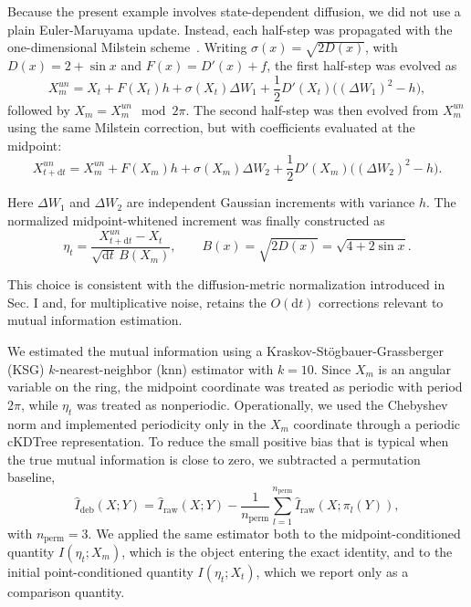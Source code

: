 Because the present example involves state-dependent diffusion, we did not use a plain Euler-Maruyama update. Instead, each half-step was propagated with the one-dimensional Milstein scheme~\cite{milstein1975strong,kloeden1992numerical}. Writing $\sigma(x)=\sqrt{2D(x)}$, with $D(x)=2+\sin x$ and $F(x)=D'(x)+f$, the first half-step was evolved as
\[
    X_m^{un}=X_t+F(X_t)h+\sigma(X_t)\Delta W_1
    +\frac{1}{2}D'(X_t)\big((\Delta W_1)^2-h\big),
\]
followed by $X_m=X_m^{un}\mod{2\pi}$. The second half-step was then evolved from $X_m^{un}$ using the same Milstein correction, but with coefficients evaluated at the midpoint:
\[
    X_{t+\mathrm dt}^{un}=X_m^{un}+F(X_m)h+\sigma(X_m)\Delta W_2
    +\frac{1}{2}D'(X_m)\big((\Delta W_2)^2-h\big).
\]

Here $\Delta W_1$ and $\Delta W_2$ are independent Gaussian increments with variance $h$. The normalized midpoint-whitened increment was finally constructed as
\[
    \eta_t=\frac{X_{t+\mathrm dt}^{un}-X_t}{\sqrt{\mathrm dt}\,B(X_m)},
    \qquad B(x)=\sqrt{2D(x)}=\sqrt{4+2\sin x}.
\]

This choice is consistent with the diffusion-metric normalization introduced in Sec. I and, for multiplicative noise, retains the $O(\mathrm dt)$ corrections relevant to mutual information estimation.

We estimated the mutual information using a Kraskov-Stögbauer-Grassberger (KSG) $k$-nearest-neighbor (knn) estimator with $k=10$. Since $X_m$ is an angular variable on the ring, the midpoint coordinate was treated as periodic with period $2\pi$, while $\eta_t$ was treated as nonperiodic. Operationally, we used the Chebyshev norm and implemented periodicity only in the $X_m$ coordinate through a periodic cKDTree representation. To reduce the small positive bias that is typical when the true mutual information is close to zero, we subtracted a permutation baseline,
\[
    \hat I_{\mathrm{deb}}(X;Y)=\hat I_{\mathrm{raw}}(X;Y)
    -\frac{1}{n_{\mathrm{perm}}}\sum_{l=1}^{n_{\mathrm{perm}}}
    \hat I_{\mathrm{raw}}(X;\pi_l (Y)),
\]
with $n_{\mathrm{perm}}=3$. We applied the same estimator both to the midpoint-conditioned quantity $I(\eta_t;X_m)$, which is the object entering the exact identity, and to the initial point-conditioned quantity $I(\eta_t;X_t)$, which we report only as a comparison quantity.

